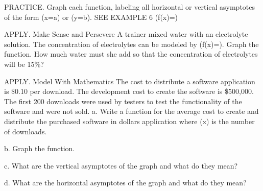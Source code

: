 \documentclass{article}
\newenvironment{practice}[2]{}{}        %
\newcommand{\answer}[1]{}               %
\newcommand{\placeholder}[2]{}          %
\newcommand{\te}[1]{}                   %
\begin{document}
\begin{practice}{30}{2}
PRACTICE. Graph each function, labeling all horizontal or vertical asymptotes of the form (x=a) or (y=b). SEE EXAMPLE 6
(f(x)=)
\answer{See graph.}
\placeholder{graph}{Practice30 red (6x^2-12x)/(x^2+5x-24), axes x,y,O; window x -25 to25,y -100 to100, grid x5,y20; labels x -20,-10,10,20,y -80,-40,40,80. Dashed blue x=-8,x3,y6, arrows; three red branches, six end arrows, middle near origin and below y6. No marked points.}
\end{practice}
\begin{practice}{31}{2}
APPLY. Make Sense and Persevere A trainer mixed water with an electrolyte solution. The concentration of electrolytes can be modeled by (f(x)=). Graph the function. How much water must she add so that the concentration of electrolytes will be 15\%?
\placeholder{illustration}{Trainer pours jug of water into orange cooler; jug callout x gal of water; cooler callout 12 gal of 25 percent electrolyte solution.}
\answer{8 gallons of water:}
\placeholder{graph}{Printed practice31 red reciprocal graph, axes x,y,O, window x -25 to25,y -2.5 to2.5, grid x5,y0.5, labels x -20,-10,10,20,y -2,-1,1,2. Two arrowed branches, implicit vertical asymptote near x=-12 and horizontal y0; y-intercept about0.25, no marked points.}
\end{practice}
\begin{practice}{32}{2}
APPLY. Model With Mathematics The cost to distribute a software application is \$0.10 per download. The development cost to create the software is \$500,000. The first 200 downloads were used by testers to test the functionality of the software and were not sold.
a. Write a function for the average cost to create and distribute the purchased software in dollars application where (x) is the number of downloads.
\te{Printed wording says in dollars application.}
\answer{a. (f(x)=\frac{0.1x+500,000}{x-200})}
b. Graph the function.
\answer{b. See graph.}
\placeholder{graph}{Practice32 red (0.1x+500000)/(x-200), axes x,y,O; window x -150 to350,y -50000 to50000, grid x50,y10000; labels x -100,100,200,300,y -40000,-20000,20000,40000. Four branch arrows, implicit asymptotes x200,y0.1; no marked points; negative branch also shown.}
c. What are the vertical asymptotes of the graph and what do they mean?
\answer{c. vertical asymptote: (x=200); to the left of the vertical asymptote is not a valid rational function, because there can never be negative sales and there were no sales on (0,200].}
\te{Printed not a valid rational function refers to the contextual domain, not the algebraic definition.}
d. What are the horizontal asymptotes of the graph and what do they mean?
\answer{d. horizontal asymptote: (y=0.1); The horizontal asymptote means that the average cost will never be less than \$0.10, the cost to download the software.}
\end{practice}
\end{document}
